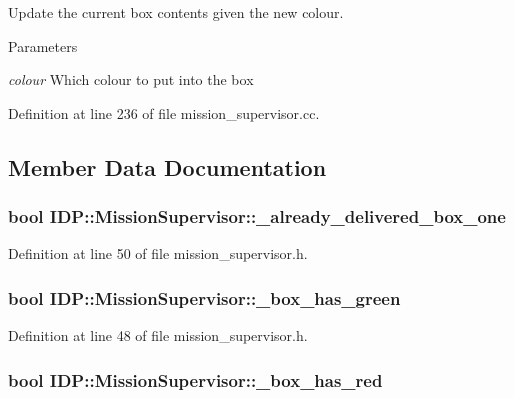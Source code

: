 Update the current box contents given the new colour. 


\begin{DoxyParams}{Parameters}
\item[{\em colour}]Which colour to put into the box \end{DoxyParams}


Definition at line 236 of file mission\_\-supervisor.cc.



\subsection{Member Data Documentation}
\hypertarget{classIDP_1_1MissionSupervisor_a7a7d76ef314e3da5d18c241f6b24f322}{
\subsubsection[{\_\-already\_\-delivered\_\-box\_\-one}]{\setlength{\rightskip}{0pt plus 5cm}bool {\bf IDP::MissionSupervisor::\_\-already\_\-delivered\_\-box\_\-one}}}
\label{classIDP_1_1MissionSupervisor_a7a7d76ef314e3da5d18c241f6b24f322}


Definition at line 50 of file mission\_\-supervisor.h.

\hypertarget{classIDP_1_1MissionSupervisor_ad1c1d2934e9d4ed0308fc2679db1b31d}{
\subsubsection[{\_\-box\_\-has\_\-green}]{\setlength{\rightskip}{0pt plus 5cm}bool {\bf IDP::MissionSupervisor::\_\-box\_\-has\_\-green}}}
\label{classIDP_1_1MissionSupervisor_ad1c1d2934e9d4ed0308fc2679db1b31d}


Definition at line 48 of file mission\_\-supervisor.h.

\hypertarget{classIDP_1_1MissionSupervisor_a18492ac38ddfaef7c58fefbbdd699099}{
\subsubsection[{\_\-box\_\-has\_\-red}]{\setlength{\rightskip}{0pt plus 5cm}bool {\bf IDP::MissionSupervisor::\_\-box\_\-has\_\-red}}}
\label{classIDP_1_1MissionSupervisor_a18492ac38ddfaef7c58fefbbdd699099}


